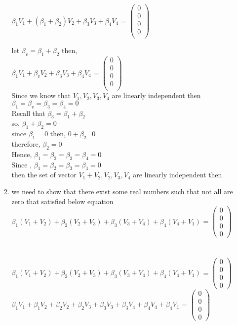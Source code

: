 \documentclass[45pt]{article}
\begin{document}
\begin{enumerate}
\begin{enumerate}
$\beta_1 V_1+ (\beta_1 +\beta_2) V_2+\beta_3 V_3+ \beta_4 V_4$ =
$\begin{pmatrix}
0\\0\\0\\0\\
\end{pmatrix}$

let $\beta_v=\beta_1+\beta_2$ then,\\

$\beta_1 V_1+ \beta_v  V_2+\beta_3 V_3+ \beta_4 V_4$ =
$\begin{pmatrix}
0\\0\\0\\0\\
\end{pmatrix}$\\
Since we know that $V_1,V_2,V_3,V_4$ are linearly independent then \\ $\beta_1=\beta_v=\beta_3=\beta_4=0$\\
Recall that $\beta_3=\beta_1+\beta_2$\\
so, $\beta_1+\beta_2=0$\\ 
since $\beta_1=0$ then, $0+\beta_2$=0\\  
therefore, $\beta_2=0$\\
Hence, $\beta_1=\beta_2=\beta_3=\beta_4=0$\\ 
Since , $\beta_1=\beta_2=\beta_3=\beta_4=0$\\ 
then the set of vector  {$V_1+V_2,V_2,V_3,V_4$} are linearly independent then \\

\item we need to show that there exist some real numbers such that not all are zero that satisfied below equation\\
$\beta_1 (V_1+V_2)+\beta_2 (V_2+V_3)+\beta_3 (V_3+V_4)+ \beta_4 (V_4+V_1)$ =
$\begin{pmatrix}
0\\0\\0\\0
\end{pmatrix}
$ \\\\

\\
$\beta_1 (V_1+V_2)+\beta_2 (V_2+V_3)+\beta_3 (V_3+V_4)+ \beta_4 (V_4+V_1)$ =
$\begin{pmatrix}
0\\0\\0\\0
\end{pmatrix}$\\
$\beta_1 V_1+\beta_1 V_2+\beta_2 V_2+ \beta_2 V_3+\beta_3 V_3+\beta_3 V_4+ \beta_4 V_4+ \beta_4 V_1$ =
$\begin{pmatrix}
0\\0\\0\\0
\end{pmatrix}$\\


\end{enumerate}
\end{enumerate}
\end{document}
